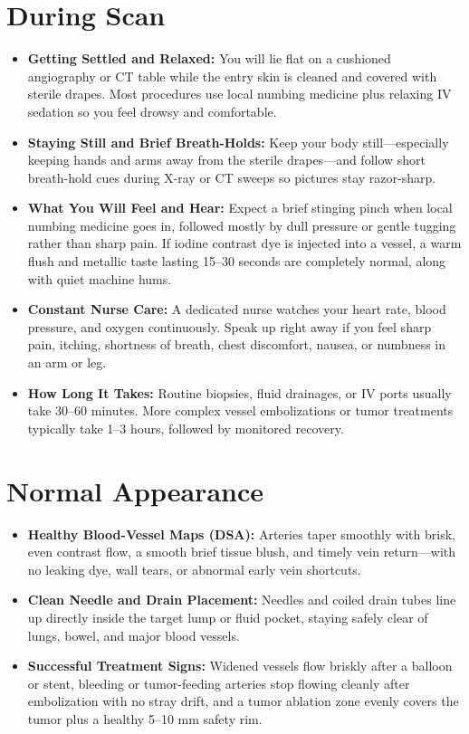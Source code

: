 \section{During Scan}

\begin{itemize}
    \item \textbf{Getting Settled and Relaxed:} You will lie flat on a cushioned angiography or CT table while the entry skin is cleaned and covered with sterile drapes. Most procedures use local numbing medicine plus relaxing IV sedation so you feel drowsy and comfortable.
    \item \textbf{Staying Still and Brief Breath-Holds:} Keep your body still---especially keeping hands and arms away from the sterile drapes---and follow short breath-hold cues during X-ray or CT sweeps so pictures stay razor-sharp.
    \item \textbf{What You Will Feel and Hear:} Expect a brief stinging pinch when local numbing medicine goes in, followed mostly by dull pressure or gentle tugging rather than sharp pain. If iodine contrast dye is injected into a vessel, a warm flush and metallic taste lasting 15--30 seconds are completely normal, along with quiet machine hums.
    \item \textbf{Constant Nurse Care:} A dedicated nurse watches your heart rate, blood pressure, and oxygen continuously. Speak up right away if you feel sharp pain, itching, shortness of breath, chest discomfort, nausea, or numbness in an arm or leg.
    \item \textbf{How Long It Takes:} Routine biopsies, fluid drainages, or IV ports usually take 30--60 minutes. More complex vessel embolizations or tumor treatments typically take 1--3 hours, followed by monitored recovery.
\end{itemize}

\section{Normal Appearance}

\begin{itemize}
    \item \textbf{Healthy Blood-Vessel Maps (DSA):} Arteries taper smoothly with brisk, even contrast flow, a smooth brief tissue blush, and timely vein return---with no leaking dye, wall tears, or abnormal early vein shortcuts.
    \item \textbf{Clean Needle and Drain Placement:} Needles and coiled drain tubes line up directly inside the target lump or fluid pocket, staying safely clear of lungs, bowel, and major blood vessels.
    \item \textbf{Successful Treatment Signs:} Widened vessels flow briskly after a balloon or stent, bleeding or tumor-feeding arteries stop flowing cleanly after embolization with no stray drift, and a tumor ablation zone evenly covers the tumor plus a healthy 5--10 mm safety rim.
\end{itemize}

